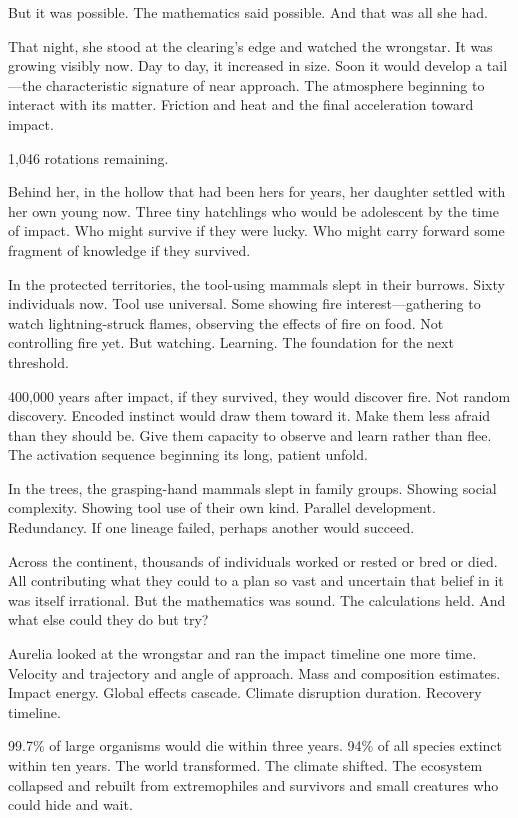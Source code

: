 But it was possible. The mathematics said possible. And that was all she had.

\scenebreak

That night, she stood at the clearing's edge and watched the wrongstar. It was growing visibly now. Day to day, it increased in size. Soon it would develop a tail—the characteristic signature of near approach. The atmosphere beginning to interact with its matter. Friction and heat and the final acceleration toward impact.

1,046 rotations remaining.

Behind her, in the hollow that had been hers for years, her daughter settled with her own young now. Three tiny hatchlings who would be adolescent by the time of impact. Who might survive if they were lucky. Who might carry forward some fragment of knowledge if they survived.

In the protected territories, the tool-using mammals slept in their burrows. Sixty individuals now. Tool use universal. Some showing fire interest—gathering to watch lightning-struck flames, observing the effects of fire on food. Not controlling fire yet. But watching. Learning. The foundation for the next threshold.

400,000 years after impact, if they survived, they would discover fire. Not random discovery. Encoded instinct would draw them toward it. Make them less afraid than they should be. Give them capacity to observe and learn rather than flee. The activation sequence beginning its long, patient unfold.

In the trees, the grasping-hand mammals slept in family groups. Showing social complexity. Showing tool use of their own kind. Parallel development. Redundancy. If one lineage failed, perhaps another would succeed.

Across the continent, thousands of individuals worked or rested or bred or died. All contributing what they could to a plan so vast and uncertain that belief in it was itself irrational. But the mathematics was sound. The calculations held. And what else could they do but try?

Aurelia looked at the wrongstar and ran the impact timeline one more time. Velocity and trajectory and angle of approach. Mass and composition estimates. Impact energy. Global effects cascade. Climate disruption duration. Recovery timeline.

99.7\% of large organisms would die within three years. 94\% of all species extinct within ten years. The world transformed. The climate shifted. The ecosystem collapsed and rebuilt from extremophiles and survivors and small creatures who could hide and wait.

